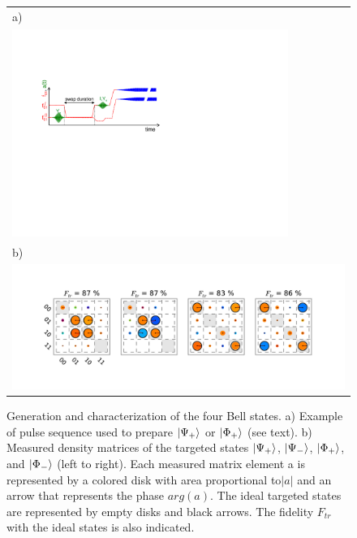\begin{figure}[b!]
  \flushright
	\begin{tabular}{l}
	a) \\
	\includegraphics[width=9cm]{"./material/figures/measurement/bell_state_creation"} \\
	b) \\
	\includegraphics[width=1\textwidth]{"./data/ct5/2011_02_09 preparation of bell states/bell matrices"}
	\end{tabular}
	\caption{Generation and characterization of the four Bell states. a) Example of pulse sequence used to prepare $\left| \Psi_+ \right>$ or $\left| \Phi_+ \right>$  (see text). b) Measured density matrices of the targeted states $\left| \Psi_+ \right>$, $\left| \Psi_- \right>$, $\left| \Phi_+ \right>$, and $\left| \Phi_- \right>$ (left to right). Each measured matrix element a is represented by a colored disk with area proportional to$|a|$ and an arrow that represents the phase $arg(a)$. The ideal targeted states are represented by empty disks and black arrows. The fidelity $F_{tr}$ with the ideal states is also indicated.}
	\label{fig:bell_generation_pulse_sequence}
	\label{fig:bell_states}
\end{figure}


